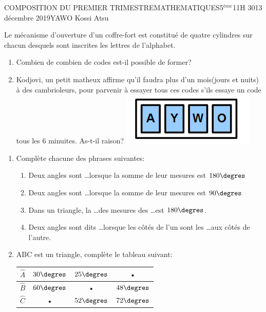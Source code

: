 \documentclass[12pt,a4paper]{book}
\newcommand{\prof}{YAWO Kossi Atsu}
\newcommand{\matiere}{MATHEMATIQUES}
\newcommand{\classe}{5$^{ème}$}
\begin{document}
\begin{devoir}{COMPOSITION DU PREMIER TRIMESTRE}{\matiere}{\classe}{1}{1H 30}{13 décembre 2019}{\prof}

\begin{exo}[5]
\begin{multicols}{2}
Le mécanisme d'ouverture d'un coffre-fort est constitué de quatre cylindres sur chacun desquels sont inscrites les lettres de l'alphabet.
\begin{enumerate}
\item Combien de combien de codes est-il possible de former?
\item Kodjovi, un petit matheux affirme qu'il faudra plus d'un mois(jours et nuits) à des cambrioleurs, pour parvenir à essayer tous ces codes s'ils essaye un code tous les 6 minuites. As-t-il raison?
\includegraphics[scale=0.8]{images/compo1img1.png}
\end{enumerate}
\end{multicols}
\end{exo}

\vspace{0.5cm}

\begin{exo}[5]
\begin{multicols}{2}
\begin{enumerate}
\item Complète chacune des phrases suivantes:
\begin{enumerate}
\item Deux angles sont \ldots lorsque la somme de leur mesures est $180\degres$
\item Deux angles sont \ldots lorsque la somme de leur mesures est $90\degres$
\item Dans un triangle, la \ldots des mesures des \ldots est $180\degres$.
\item Deux angles sont dits \ldots lorsque les côtés de l'un sont les \ldots aux côtés de l'autre.
\end{enumerate}
\item ABC est un triangle, complète le tableau suivant:\\
\begin{tabular}{|c|c|c|c|}
\hline 
$\widehat{A}$ & $30 \degres$ &  $25 \degres$ & • \\ 
\hline 
$\widehat{B}$ &  $60 \degres$ & • &  $48 \degres$ \\ 
\hline 
$\widehat{C}$ & • &  $52 \degres$ &  $72 \degres$ \\ 
\hline 
\end{tabular} 


\end{enumerate}
\end{multicols}
\end{exo}
\end{devoir}
\end{document}

